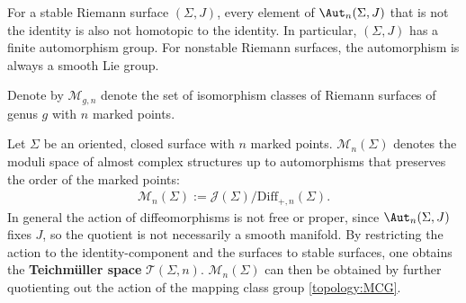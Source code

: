     \begin{property}
        For a stable Riemann surface $(\Sigma,J)$, every element of $\Aut_n(\Sigma,J)$ that is not the identity is also not homotopic to the identity. In particular, $(\Sigma,J)$ has a finite automorphism group. For nonstable Riemann surfaces, the automorphism is always a smooth Lie group.
    \end{property}

    \begin{construct}
        Denote by $\mathcal{M}_{g,n}$ denote the set of isomorphism classes of Riemann surfaces of genus $g$ with $n$ marked points.

        Let $\Sigma$ be an oriented, closed surface with $n$ marked points. $\mathcal{M}_n(\Sigma)$ denotes the moduli space of almost complex structures up to automorphisms that preserves the order of the marked points:
        \begin{gather}
            \mathcal{M}_n(\Sigma) := \mathcal{J}(\Sigma)/\mathrm{Diff}_{+,n}(\Sigma).
        \end{gather}
        In general the action of diffeomorphisms is not free or proper, since $\Aut_n(\Sigma,J)$ fixes $J$, so the quotient is not necessarily a smooth manifold. By restricting the action to the identity-component and the surfaces to stable surfaces, one obtains the \textbf{Teichm\"uller space} $\mathcal{T}(\Sigma,n)$. $\mathcal{M}_n(\Sigma)$ can then be obtained by further quotienting out the action of the mapping class group \ref{topology:MCG}.
    \end{construct}

